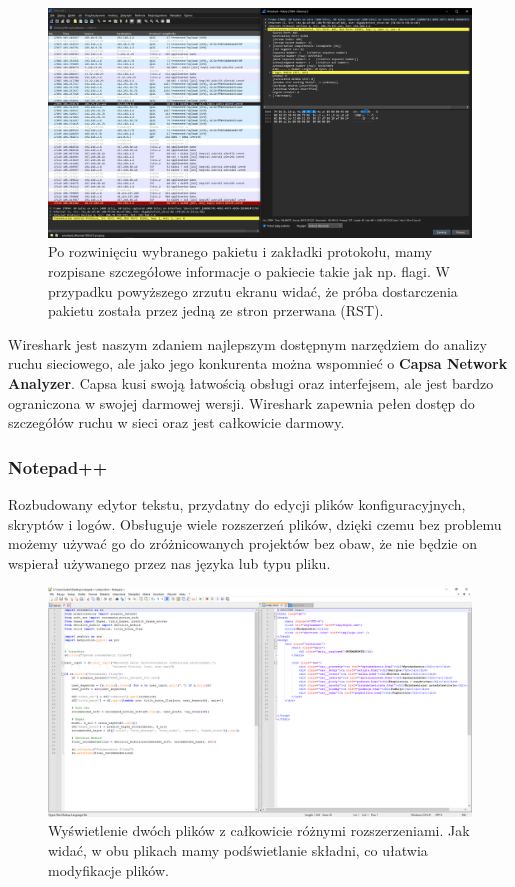 \documentclass[0.82pt,a4paper]{article}
\begin{document}
    \begin{figure}[H]
        \centering
        \includegraphics[width=0.8\linewidth]{media/Wireshark/wireshark4_odrzucone.PNG}
        \caption[wireshark odrzucone]{Po rozwinięciu wybranego pakietu i zakładki protokołu, mamy rozpisane szczegółowe informacje o pakiecie takie jak np. flagi. W przypadku powyższego zrzutu ekranu widać, że próba dostarczenia pakietu została przez jedną ze stron przerwana (RST).}
        \label{fig:wireshark_odrzucone}
    \end{figure}
    Wireshark jest naszym zdaniem najlepszym dostępnym narzędziem do analizy ruchu sieciowego, ale jako jego konkurenta można wspomnieć o \textbf{Capsa Network Analyzer}. Capsa kusi swoją łatwością obsługi oraz interfejsem, ale jest bardzo ograniczona w swojej darmowej wersji. Wireshark zapewnia pełen dostęp do szczegółów ruchu w sieci oraz jest całkowicie darmowy.
\newpage
\subsubsection{Notepad++}
    Rozbudowany edytor tekstu, przydatny do edycji plików konfiguracyjnych, skryptów i logów. Obsługuje wiele rozszerzeń plików, dzięki czemu bez problemu możemy używać go do zróżnicowanych projektów bez obaw, że nie będzie on wspierał używanego przez nas języka lub typu pliku.

    \begin{figure}[H]
        \centering
        \includegraphics[width=0.8\linewidth]{media/Notepad/notepad1.PNG}
        \caption[notepad glowne]{Wyświetlenie dwóch plików z całkowicie różnymi rozszerzeniami. Jak widać, w obu plikach mamy podświetlanie składni, co ułatwia modyfikacje plików.}
        \label{fig:notepad_glowne}
    \end{figure}
\end{document}
